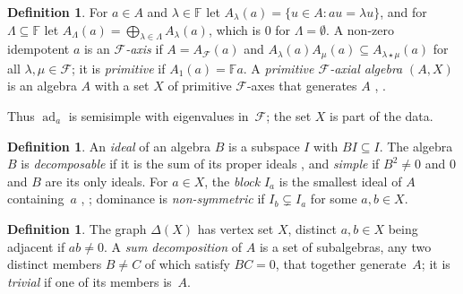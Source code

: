 \documentclass[11pt]{article}
\theoremstyle{definition}
\newtheorem{definition}[lemma]{Definition}
\theoremstyle{remark}
\newcommand{\F}{\mathbb F}
\newcommand{\cF}{\mathcal F}
\newcommand{\ad}{\operatorname{ad}}
\begin{document}
\begin{definition}\label{def:axis}
For $a\in A$ and $\lambda\in\F$ let $A_\lambda(a)=\{u\in A: au=\lambda u\}$,
and for $\Lambda\subseteq\F$ let
$A_\Lambda(a)=\bigoplus_{\lambda\in\Lambda}A_\lambda(a)$, which is $0$ for
$\Lambda=\emptyset$. A non-zero idempotent $a$ is an \emph{$\cF$-axis} if
$A=A_\cF(a)$ and $A_\lambda(a)A_\mu(a)\subseteq A_{\lambda\star\mu}(a)$ for
all $\lambda,\mu\in\cF$; it is \emph{primitive} if $A_1(a)=\F a$. A
\emph{primitive $\cF$-axial algebra} $(A,X)$ is an algebra $A$ with a set
$X$ of primitive $\cF$-axes that generates $A$ \cite[Defs~2.2--2.4]{msz},
\cite[Defs~2.2--2.4]{ms}.
\end{definition}

Thus $\ad_a$ is semisimple with eigenvalues in~$\cF$; the set $X$ is part
of the data.

\begin{definition}\label{def:ideal}
An \emph{ideal} of an algebra $B$ is a subspace $I$ with $BI\subseteq I$.
The algebra $B$ is \emph{decomposable} if it is the sum of its proper ideals
\cite[Def.~3.3]{msz}, and \emph{simple} if $B^2\ne0$ and $0$ and $B$ are its
only ideals. For $a\in X$, the \emph{block} $I_a$ is the smallest ideal of
$A$ containing~$a$ \cite[Def.~3.1]{msz}, \cite[Def.~3.7]{gs}; dominance is
\emph{non-symmetric} if $I_b\subsetneq I_a$ for some $a,b\in X$.
\end{definition}

\begin{definition}\label{def:delta}
The graph $\Delta(X)$ has vertex set $X$, distinct $a,b\in X$ being adjacent
if $ab\ne0$. A \emph{sum decomposition} of $A$ is a set of subalgebras, any
two distinct members $B\ne C$ of which satisfy $BC=0$, that together
generate~$A$; it is \emph{trivial} if one of its members is~$A$.
\end{definition}
\end{document}
